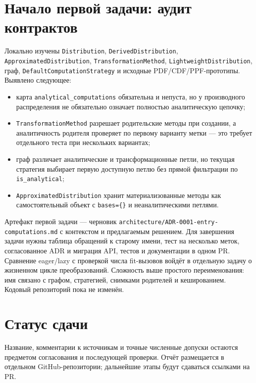 \documentclass[12pt,a4paper]{article}
\begin{document}
\section{Начало первой задачи: аудит контрактов}
Локально изучены \texttt{Distribution}, \texttt{DerivedDistribution}, \texttt{ApproximatedDistribution}, \texttt{TransformationMethod}, \texttt{LightweightDistribution}, граф, \texttt{DefaultComputationStrategy} и исходные PDF/CDF/PPF-прототипы. Выявлено следующее:
\begin{itemize}[leftmargin=*]
  \item карта \texttt{analytical\_computations} обязательна и непуста, но у производного распределения не обязательно означает полностью аналитическую цепочку;
  \item \texttt{TransformationMethod} разрешает родительские методы при создании, а аналитичность родителя проверяет по первому варианту метки — это требует отдельного теста при нескольких вариантах;
  \item граф различает аналитические и трансформационные петли, но текущая стратегия выбирает первую доступную петлю без прямой фильтрации по \texttt{is\_analytical};
  \item \texttt{ApproximatedDistribution} хранит материализованные методы как самостоятельный объект с \texttt{bases=\{\}} и неаналитическими петлями.
\end{itemize}
Артефакт первой задачи — черновик \texttt{architecture/ADR-0001-entry-computations.md} с контекстом и предлагаемым решением. Для завершения задачи нужны таблица обращений к старому имени, тест на несколько меток, согласованное ADR и миграция API, тестов и документации в одном PR. Сравнение eager/lazy с проверкой числа fit-вызовов войдёт в отдельную задачу о жизненном цикле преобразований. Сложность выше простого переименования: имя связано с графом, стратегией, снимками родителей и кешированием. Кодовый репозиторий пока не изменён.

\section*{Статус сдачи}
Название, комментарии к источникам и точные численные допуски остаются предметом согласования и последующей проверки. Отчёт размещается в отдельном GitHub-репозитории; дальнейшие этапы будут сдаваться ссылками на PR.
\end{document}
